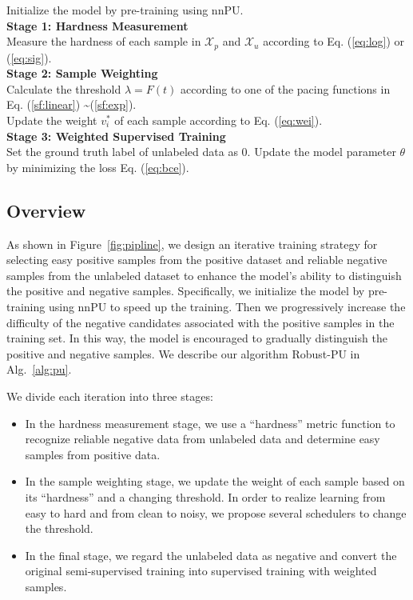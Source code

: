 \documentclass[sigconf]{acmart}
\newcommand{\ourmethod}{Robust-PU\xspace}
\begin{document}
\begin{algorithm}
    \caption{\ourmethod}\label{alg:pu}
    Initialize the model by pre-training using nnPU.\\
    {
    \textbf{Stage 1: Hardness Measurement}\\
        Measure the hardness of each sample in $\mathcal{X}_p$ and $\mathcal{X}_u$ according to Eq. (\ref{eq:log}) or (\ref{eq:sig}).\\
    \textbf{Stage 2: Sample Weighting}\\
    Calculate the threshold $\lambda=F(t)$ according to one of the pacing functions in Eq. (\ref{sf:linear}) \textasciitilde (\ref{sf:exp}).\\
    Update the weight $v^*_i$ of each sample according to Eq. (\ref{eq:wei}).\\
    \textbf{Stage 3: Weighted Supervised Training}\\
    {
    Set the ground truth label of unlabeled data as 0.
    Update the model parameter $\theta$ by minimizing the loss Eq. (\ref{eq:bce}).
    }
    }
\end{algorithm}


\subsection{Overview}\label{sec:overview}
As shown in Figure~\ref{fig:pipline}, we design an iterative training strategy for selecting easy positive samples from the positive dataset and reliable negative samples from the unlabeled dataset to enhance the model’s ability to distinguish the positive and negative samples.
Specifically, we initialize the model by pre-training using nnPU to speed up the training. Then we progressively increase the difficulty of the negative candidates associated with the positive samples in the training set. In this way, the model is encouraged to gradually distinguish the positive and negative samples.
We describe our algorithm \ourmethod in Alg.~\ref{alg:pu}.

We divide each iteration into three stages:

\begin{itemize}
\item In the hardness measurement stage, we use a ``hardness'' metric function to recognize reliable negative data from unlabeled data and determine easy samples from positive data.
\item In the sample weighting stage, we update the weight of each sample based on its ``hardness'' and a changing threshold. In order to realize learning from easy to hard and from clean to noisy, we propose several schedulers to change the threshold.
\item In the final stage, we regard the unlabeled data as negative and convert the original semi-supervised training into supervised training with weighted samples.
\end{itemize}
\end{document}
